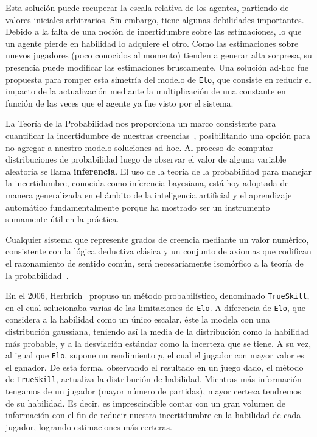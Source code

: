 \documentclass[11pt,twoside,spanish]{report} %
\begin{document}
Esta soluci\'on puede recuperar la escala relativa de los agentes, partiendo de valores iniciales arbitrarios.
Sin embargo, tiene algunas debilidades importantes.
Debido a la falta de una noci\'on de incertidumbre sobre las estimaciones, lo que un agente pierde en habilidad lo adquiere el otro.
Como las estimaciones sobre nuevos jugadores (poco conocidos al momento) tienden a generar alta sorpresa, su presencia puede modificar las estimaciones bruscamente.
Una soluci\'on ad-hoc fue propuesta para romper esta simetr\'ia del modelo de \texttt{Elo}, que consiste en reducir el impacto de la actualizaci\'on mediante la multiplicaci\'on de una constante en funci\'on de las veces que el agente ya fue visto por el sistema.

La Teor\'ia de la Probabilidad nos proporciona un marco consistente para cuantificar la incertidumbre de nuestras creencias~\cite{bishop2006-PRML}, posibilitando una opci\'on para no agregar a nuestro modelo soluciones ad-hoc.
Al proceso de computar distribuciones de probabilidad luego de observar el valor de alguna variable aleatoria se llama \textbf{inferencia}.
El uso de la teor\'ia de la probabilidad para manejar la incertidumbre, conocida como inferencia bayesiana, est\'a hoy adoptada de manera generalizada en el \'ambito de la inteligencia artificial y el aprendizaje autom\'atico fundamentalmente porque ha mostrado ser un instrumento sumamente \'util en la pr\'actica.

Cualquier sistema que represente grados de creencia mediante un valor num\'erico, consistente con la l\'ogica deductiva cl\'asica y un conjunto de axiomas que codifican el razonamiento de sentido com\'un, ser\'a necesariamente isom\'orfico a la teor\'ia de la probabilidad~\cite{Cox1946,vanHorn2003}.

En el 2006, Herbrich~\cite{Herbrich2007} propuso un m\'etodo probabil\'istico, denominado \texttt{TrueSkill}, en el cual solucionaba varias de las limitaciones de \texttt{Elo}.
A diferencia de \texttt{Elo}, que considera a la habilidad como un \'unico escalar, \'este la modela con una distribuci\'on gaussiana, teniendo as\'i la media de la distribuci\'on como la habilidad m\'as probable, y a la desviaci\'on est\'andar como la incerteza que se tiene.
A su vez, al igual que \texttt{Elo}, supone un rendimiento $p$, el cual el jugador con mayor valor es el ganador.
De esta forma, observando el resultado en un juego dado, el m\'etodo de \texttt{TrueSkill}, actualiza la distribuci\'on de habilidad.
Mientras m\'as informaci\'on tengamos de un jugador (mayor n\'umero de partidas), mayor certeza tendremos de su habilidad.
Es decir, es imprescindible contar con un gran volumen de informaci\'on con el fin de reducir nuestra incertidumbre en la habilidad de cada jugador, logrando estimaciones m\'as certeras.
\end{document}

